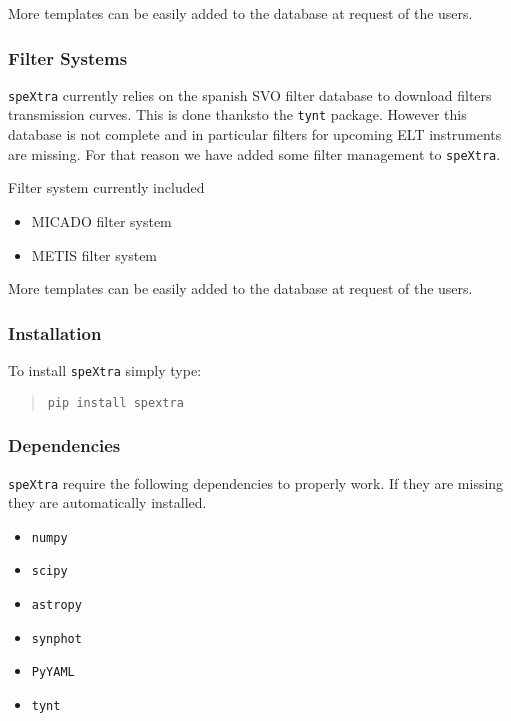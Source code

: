 More templates can be easily added to the database at request of the users.


\subsubsection{Filter Systems%
  \label{filter-systems}%
}

\texttt{speXtra} currently relies on the spanish SVO filter database to download filters transmission curves.
This is done thanksto the \texttt{tynt} package. However this database is not complete and in particular filters for upcoming
ELT instruments are missing. For that reason we have added some filter management to \texttt{speXtra}.

Filter system currently included

\begin{itemize}
\item MICADO filter system

\item METIS filter system
\end{itemize}

More templates can be easily added to the database at request of the users.


\subsubsection{Installation%
  \label{installation}%
}

To install \texttt{speXtra} simply type:

\begin{quote}
\begin{alltt}
\begin{lstlisting}[frame=single]
pip install spextra
\end{lstlisting}
\end{alltt}
\end{quote}


\subsubsection{Dependencies%
  \label{dependencies}%
}

\texttt{speXtra} require the following dependencies to properly work. If they are missing they are automatically
installed.

\begin{itemize}
\item \texttt{numpy}

\item \texttt{scipy}

\item \texttt{astropy}

\item \texttt{synphot}

\item \texttt{PyYAML}

\item \texttt{tynt}
\end{itemize}



